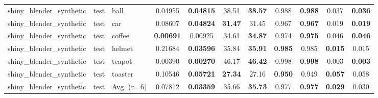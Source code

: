 \begin{table}[t]
{\begin{tabular}{lllcccccccc}
\midrule
shiny\_blender\_synthetic & test & ball & 0.04955 & \textbf{0.04815} & 38.51 & \textbf{38.57} & 0.988 & \textbf{0.988} & 0.037 & \textbf{0.036} \\
shiny\_blender\_synthetic & test & car & 0.08607 & \textbf{0.04824} & \textbf{31.47} & 31.45 & 0.967 & \textbf{0.967} & 0.019 & \textbf{0.019} \\
shiny\_blender\_synthetic & test & coffee & \textbf{0.00691} & 0.00925 & 34.61 & \textbf{34.87} & 0.974 & \textbf{0.975} & 0.046 & \textbf{0.046} \\
shiny\_blender\_synthetic & test & helmet & 0.21684 & \textbf{0.03596} & 35.84 & \textbf{35.91} & \textbf{0.985} & 0.985 & \textbf{0.015} & 0.015 \\
shiny\_blender\_synthetic & test & teapot & 0.00390 & \textbf{0.00270} & 46.17 & \textbf{46.42} & 0.998 & \textbf{0.998} & 0.003 & \textbf{0.003} \\
shiny\_blender\_synthetic & test & toaster & 0.10546 & \textbf{0.05721} & \textbf{27.34} & 27.16 & \textbf{0.950} & 0.949 & \textbf{0.057} & 0.058 \\
shiny\_blender\_synthetic & test & Avg. (n=6) & 0.07812 & \textbf{0.03359} & 35.66 & \textbf{35.73} & 0.977 & \textbf{0.977} & \textbf{0.029} & 0.030 \\
\bottomrule
\end{tabular}}
\end{table}
